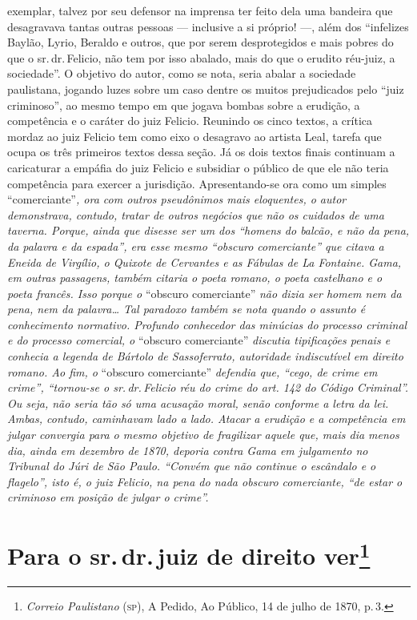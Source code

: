 \begin{argumento}
{exemplar, talvez por seu defensor na imprensa ter feito dela uma
bandeira que desagravava tantas outras pessoas --- inclusive a si
próprio! ---, além dos ``infelizes Baylão, Lyrio, Beraldo e outros, que
por serem desprotegidos e mais pobres do que o sr.\,dr.\,Felicio, não tem
por isso abalado, mais do que o erudito réu-juiz, a sociedade''. O
objetivo do autor, como se nota, seria abalar a sociedade paulistana,
jogando luzes sobre um caso dentre os muitos prejudicados pelo ``juiz
criminoso'', ao mesmo tempo em que jogava bombas sobre a erudição, a
competência e o caráter do juiz Felicio. Reunindo os cinco textos, a
crítica mordaz ao juiz Felicio tem como eixo o desagravo ao artista
Leal, tarefa que ocupa os três primeiros textos dessa seção. Já os dois
textos finais continuam a caricaturar a empáfia do juiz Felicio e
subsidiar o público de que ele não teria competência para exercer a
jurisdição. Apresentando-se ora como um simples} ``comerciante''\emph{,
ora com outros pseudônimos mais eloquentes, o autor demonstrava,
contudo, tratar de outros negócios que não os cuidados de uma taverna.
Porque, ainda que disesse ser um dos ``homens do balcão, e não da pena,
da palavra e da espada'', era esse mesmo ``obscuro comerciante'' que citava
a Eneida de Virgílio, o Quixote de Cervantes e as Fábulas de La
Fontaine. Gama, em outras passagens, também citaria o poeta romano, o
poeta castelhano e o poeta francês. Isso porque o} ``obscuro comerciante''
\emph{não dizia ser homem nem da pena, nem da palavra\ldots{} Tal paradoxo
também se nota quando o assunto é conhecimento normativo. Profundo
conhecedor das minúcias do processo criminal e do processo comercial, o}
``obscuro comerciante'' \emph{discutia tipificações penais e conhecia a
legenda de Bártolo de Sassoferrato, autoridade indiscutível em direito
romano. Ao fim, o} ``obscuro comerciante'' \emph{defendia que, ``cego, de
crime em crime'', ``tornou-se o sr.\,dr.\,Felicio réu do crime do art. 142
do Código Criminal''. Ou seja, não seria tão só uma acusação moral, senão
conforme a letra da lei. Ambas, contudo, caminhavam lado a lado. Atacar
a erudição e a competência em julgar convergia para o mesmo objetivo de
fragilizar aquele que, mais dia menos dia, ainda em dezembro de 1870,
deporia contra Gama em julgamento no Tribunal do Júri de São Paulo.
``Convém que não continue o escândalo e o flagelo'', isto é, o juiz
Felicio, na pena do nada obscuro comerciante, ``de estar o criminoso em
posição de julgar o crime''.}
\end{argumento}

\chapter{Para o sr.\,dr.\,juiz de direito ver\footnote{\emph{Correio Paulistano} (\textsc{sp}), A Pedido, Ao Público,
  14 de julho de 1870, p.\,3.}} %

